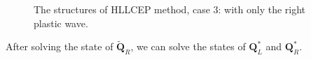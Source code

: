 \documentclass{article}
\numberwithin{equation}{section}
\numberwithin{table}{section}
\begin{document}
\begin{figure}
  \centering
 \begin{tikzpicture}
\end{tikzpicture}
\caption{The  structures of HLLCEP method, case 3: with only  the right  plastic wave.}
\label{fig:case3}
\end{figure}

After solving the state of $\widetilde{\bm{Q}}_R$, we can solve the states of $\bm{Q}_L^*$ and  $\bm{Q}_R^*$.
\end{document}
